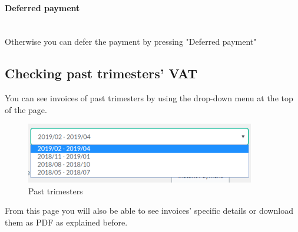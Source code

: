 	\paragraph{Deferred payment} \mbox{}\\
	Otherwise you can defer the payment by pressing "Deferred payment" 
	\subsection{Checking past trimesters' VAT}
	You can see invoices of past trimesters by using the drop-down 
	menu at the top of the page.
	\begin{figure}[H]
		\includegraphics[width=10cm]{res/images/past_trimesters.png}
		\centering
		\caption{Past trimesters}
	\end{figure}
	\noindent From this page you will also be able to see invoices' specific 
	details or download them as PDF as explained before.